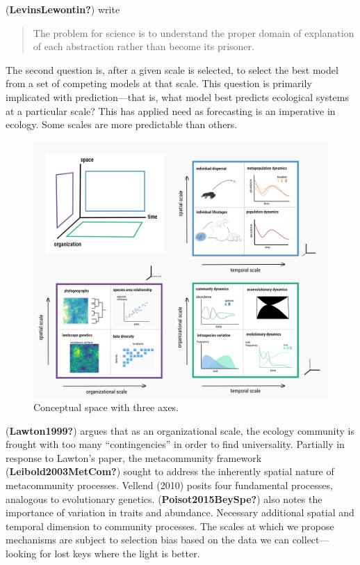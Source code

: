 \documentclass[11pt]{article}
\makeatletter
\def\maxwidth{\ifdim\Gin@nat@width>\linewidth\linewidth
\else\Gin@nat@width\fi}
\let\Oldincludegraphics\includegraphics
\renewcommand{\includegraphics}[1]{\Oldincludegraphics[width=\maxwidth]{#1}}
\makeatother
\begin{document}
(\textbf{LevinsLewontin?}) write

\begin{quote}
The problem for science is to understand the proper domain of
explanation of each abstraction rather than become its prisoner.
\end{quote}

The second question is, after a given scale is selected, to select the
best model from a set of competing models at that scale. This question
is primarily implicated with prediction---that is, what model best
predicts ecological systems at a particular scale? This has applied need
as forecasting is an imperative in ecology. Some scales are more
predictable than others.

\begin{figure}
\hypertarget{fig:slices}{%
\centering
\includegraphics{./figures/tensorslices.png}
\caption{Conceptual space with three axes.}\label{fig:slices}
}
\end{figure}

(\textbf{Lawton1999?}) argues that as an organizational scale, the
ecology community is frought with too many ``contingencies'' in order to
find universality. Partially in response to Lawton's paper, the
metacommunity framework (\textbf{Leibold2003MetCom?}) sought to address
the inherently spatial nature of metacommunity processes. Vellend (2010)
posits four fundamental processes, analogous to evolutionary genetics.
(\textbf{Poisot2015BeySpe?}) also notes the importance of variation in
traits and abundance. Necessary additional spatial and temporal
dimension to community processes. The scales at which we propose
mechanisms are subject to selection bias based on the data we can
collect---looking for lost keys where the light is better.
\end{document}
